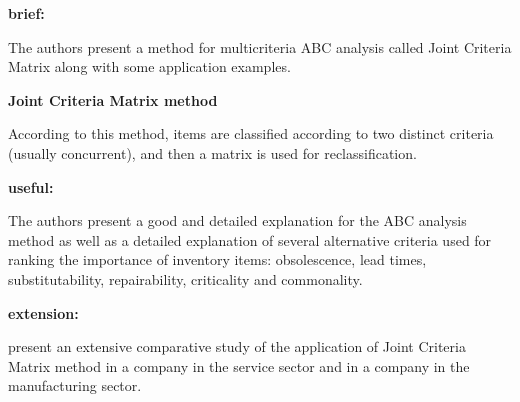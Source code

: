 \documentclass[class=article, crop=false]{standalone}
\begin{document}
\begin{adjustwidth}{-60pt}{-30pt}
\begin{singlespace}


\begin{minipage}{\textwidth}

\begin{pabox}[label={myusecounter}]{\hfill  \cite{FloresAndWhybark1986}}

\textbf{brief:}
\vspace{5pt}

The authors present a method for multicriteria ABC analysis called Joint Criteria Matrix along with some application examples.
\vspace{5pt}

\textbf{Joint Criteria Matrix method}
\vspace{5pt}

According to this method, items are classified according to two distinct criteria (usually concurrent), and then a matrix is used for reclassification.
\vspace{5pt}

\textbf{useful:}
\vspace{5pt}

The authors present a good and detailed explanation for the ABC analysis method as well as a detailed explanation of several alternative criteria used for ranking the importance of inventory items: obsolescence, lead times, substitutability, repairability, criticality and commonality.

\vspace{5pt}

\textbf{extension:}
\vspace{5pt}

\cite{FloresAndWhybark1987} present an extensive comparative study of the application of Joint Criteria Matrix method in a company in the service sector and in a company in the manufacturing sector.

\tcblower




\end{pabox}
\end{minipage}

\end{singlespace}
\end{adjustwidth}
\end{document}
